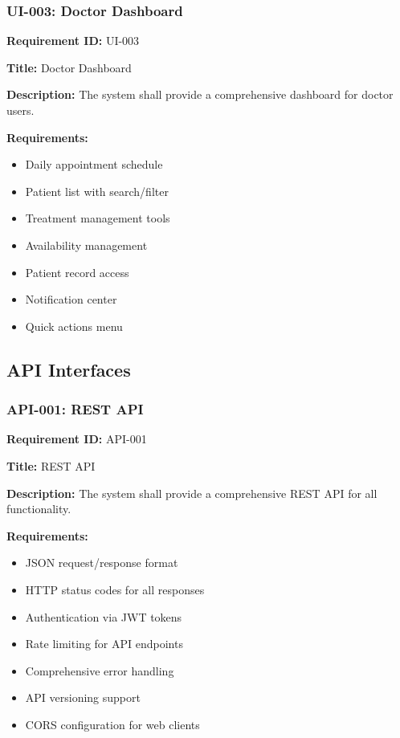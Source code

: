 \documentclass[12pt,a4paper]{article}
\begin{document}
\subsubsection{UI-003: Doctor Dashboard}

\textbf{Requirement ID:} UI-003

\textbf{Title:} Doctor Dashboard

\textbf{Description:} The system shall provide a comprehensive dashboard for doctor users.

\textbf{Requirements:}
\begin{itemize}
    \item Daily appointment schedule
    \item Patient list with search/filter
    \item Treatment management tools
    \item Availability management
    \item Patient record access
    \item Notification center
    \item Quick actions menu
\end{itemize}

\subsection{API Interfaces}

\subsubsection{API-001: REST API}

\textbf{Requirement ID:} API-001

\textbf{Title:} REST API

\textbf{Description:} The system shall provide a comprehensive REST API for all functionality.

\textbf{Requirements:}
\begin{itemize}
    \item JSON request/response format
    \item HTTP status codes for all responses
    \item Authentication via JWT tokens
    \item Rate limiting for API endpoints
    \item Comprehensive error handling
    \item API versioning support
    \item CORS configuration for web clients
\end{itemize}
\end{document}
